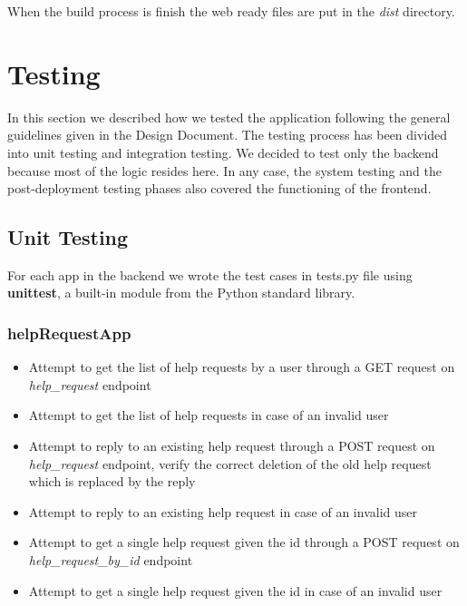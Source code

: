 \documentclass[table, 12pt]{article}
\begin{document}
When the build process is finish the web ready files are put in the \textit{dist} directory.

\newpage
\section{Testing}

In this section we described how we tested the application following the general guidelines given in the Design Document.
The testing process has been divided into unit testing and integration testing.
We decided to test only the backend because most of the logic resides here.
In any case, the system testing and the post-deployment testing phases also covered the functioning of the frontend.

\subsection{Unit Testing}
For each app in the backend we wrote the test cases in tests.py file using \textbf{unittest}, a built-in module from the Python standard library.
\subsubsection*{helpRequestApp}
\begin{itemize}
    \item Attempt to get the list of help requests by a user through a GET request on \textit{help\_request} endpoint
    \item Attempt to get the list of help requests in case of an invalid user
    \item Attempt to reply to an existing help request through a POST request on \textit{help\_request} endpoint, verify the correct deletion of the old help request which is replaced by the reply
    \item Attempt to reply to an existing help request in case of an invalid user
    \item Attempt to get a single help request given the id through a POST request on \textit{help\_request\_by\_id} endpoint
    \item Attempt to get a single help request given the id in case of an invalid user
\end{itemize}
\end{document}
